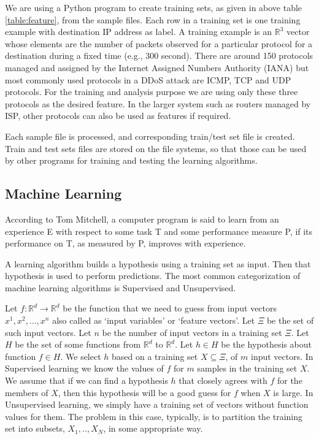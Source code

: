 \documentclass[12pt,oneside,a4paper]{article}
\begin{document}
We are using a Python program to create training sets, as given in above table \ref{table:feature}, from the sample files. Each row in a training set is one training example with destination IP address as label. A training example is an $\mathbb{R}^3$ vector whose elements are the number of packets observed for a particular protocol for a destination during a fixed time (e.g., 300 second). There are around 150 protocols managed and assigned by the Internet Assigned Numbers Authority (IANA) but most commonly used protocols in a DDoS attack are ICMP, TCP and UDP protocols. For the training and analysis purpose we are using only these three protocols as the desired feature. In the larger system such as routers managed by ISP, other protocols can also be used as features if required.

Each sample file is processed, and corresponding train/test set file is created. Train and test sets files are stored on the file systems, so that those can be used by other programs for training and testing the learning algorithms.

\subsection{Machine Learning}

According to Tom Mitchell\cite{machine-learning-def}, a computer program is said to learn from an experience E with respect to some task T and some performance measure P, if its performance on T, as measured by P, improves with experience.

A learning algorithm builds a hypothesis using a training set as input. Then that hypothesis is used to perform predictions. The most common categorization of machine learning algorithms is Supervised and Unsupervised.

Let $f: \mathbb{R}^d \rightarrow \mathbb{R}^d$ be the function that we need to guess from input vectors $x^{1}, x^{2}, ..., x^{n}$ also called as `input variables' or `feature vectors'. Let $\Xi$ be the set of such input vectors. Let $n$ be the number of input vectors in a training set $\Xi$. Let $H$ be the set of some functions from $\mathbb{R}^d$ to $\mathbb{R}^d$. Let $h \in H$ be the hypothesis about function $f \in H$. We select $h$ based on a training set $X \subseteq \Xi$, of $m$ input vectors. In Supervised learning we know the values of $f$ for $m$ samples in the training set $X$. We assume that if we can find a hypothesis $h$ that closely agrees with $f$ for the members of $X$, then this hypothesis will be a good guess for $f$ when $X$ is large. In Unsupervised learning, we simply have a training set of vectors without function values for them. The problem in this case, typically, is to partition the training set into subsets, $X_1,.. ,X_{N}$, in some appropriate way.\cite{machine-learning}
\end{document}
